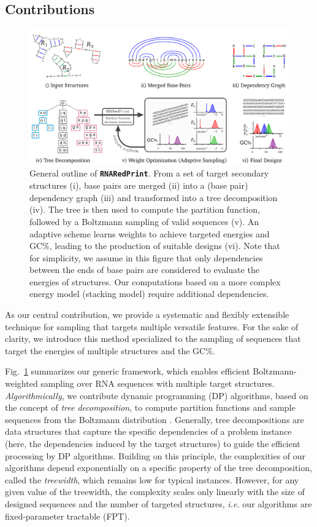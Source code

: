 \documentclass[]{bmcart}
\newcommand{\Def}[1]{\emph{#1}}
\newcommand{\Nuc}[1]{{\sf #1}}
\newcommand{\Cb}{\Nuc{C}}
\newcommand{\Gb}{\Nuc{G}}
\newcommand{\GCb}{\Gb\Cb}
\newcommand{\ourprog}{{\tt \bfseries{}\color{black!85}RNA\textcolor{red!70!black}{Red}Print}}
\newcommand{\revised}[1]{{\color{red} #1}}
\begin{document}
\subsection*{Contributions}

\begin{figure}[t]
\begin{center}
    \includegraphics[width=.8\textwidth]{Figs/Workflow}
\end{center}
\caption{General outline of \ourprog{}. From a set of target secondary structures (i), base pairs are merged (ii) into a (base pair) dependency graph (iii) and transformed into a tree decomposition (iv). The tree is then used to compute the partition function, followed by a Boltzmann sampling of valid sequences (v). An adaptive scheme learns weights to achieve targeted energies and \GCb\%, leading to the production of suitable designs (vi). \revised{Note that for simplicity, we assume in this figure that only dependencies between the ends of base pairs are considered to evaluate the energies of structures. Our computations based on a more complex energy model (stacking model) require additional dependencies.}
  }
\label{fig:workflow}
\end{figure}

\revised{As our central contribution, we provide a systematic and flexibly extensible technique for sampling that targets multiple versatile features. For the sake of clarity, we introduce this method specialized to the sampling of sequences that target the energies of multiple structures and the \GCb\%.}

\revised{Fig.~\ref{fig:workflow} summarizes our generic framework, which enables} efficient Boltzmann-weighted sampling over RNA sequences with multiple target structures. \revised{\emph{Algorithmically}, we contribute} dynamic programming (DP) algorithms, based on the concept of \Def{tree decomposition}, to compute partition functions and sample sequences from the Boltzmann distribution%
.
\revised{Generally, tree decompositions are data structures that capture the specific dependencies of a problem instance (here, the dependencies induced by the target structures) to guide the efficient processing by DP algorithms.}
%
\revised{Building on this principle, }the complexities of our algorithms depend exponentially on a specific property of the tree decomposition, called the \Def{treewidth}, which remains low for typical instances. However, for any given value of the treewidth, the complexity scales only linearly with the size of designed sequences and the number of targeted structures, \emph{i.e.} our algorithms are fixed-parameter tractable (FPT).
\end{document}
